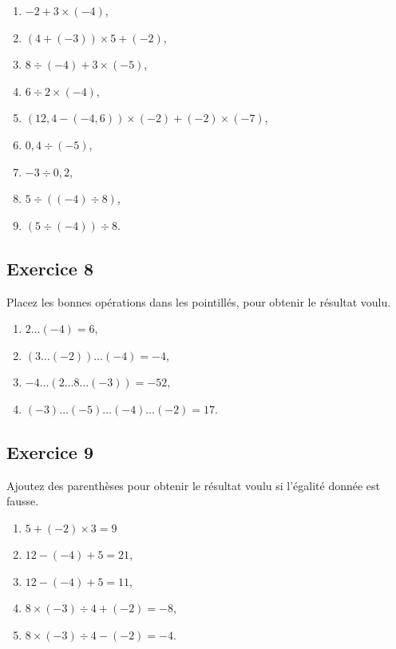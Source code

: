 \documentclass[12 pt]{extarticle}
\theoremstyle{plain}
\begin{document}
\begin{enumerate}
\item $-2 + 3 \times (-4)$, 
\item $ (4 + (-3)) \times 5 + (-2)$,
\item $ 8 \div(-4) + 3 \times (-5)$, 
\item $ 6 \div 2 \times (-4)$, 
\item $(12,4 - (-4,6)) \times (-2) + (-2) \times (-7) $, 
\item $ 0,4 \div (-5)$, 
\item $ - 3 \div 0,2$, 
\item $ 5 \div ((-4) \div 8)$,
\item $ (5 \div (-4) )\div 8$.


\end{enumerate}

\subsection*{Exercice 8}

Placez les bonnes opérations dans les pointillés, pour obtenir le résultat voulu. 

\begin{enumerate}
\item $2 \ldots (-4) = 6$, 
\item $(3 \ldots (-2) ) \ldots (-4) = -4$, 
\item $ -4 \ldots(  2 \ldots 8 \ldots (-3) )= -52$, 
\item $ (- 3) \ldots (- 5) \ldots (-4) \ldots (-2) = 17$.
\end{enumerate}

\subsection*{Exercice 9}

Ajoutez des parenthèses pour obtenir le résultat voulu si l'égalité donnée est fausse. 
\begin{enumerate}
\item $5 + (-2) \times 3 = 9$ 
\item $12 - (-4) + 5 = 21$, 
\item $12 - (-4) + 5 = 11$, 
\item $8 \times (-3) \div 4 + (-2) = - 8$,
\item $8 \times (-3) \div 4 - (-2) = -4 $. 
\end{enumerate}

 	
\end{document}
